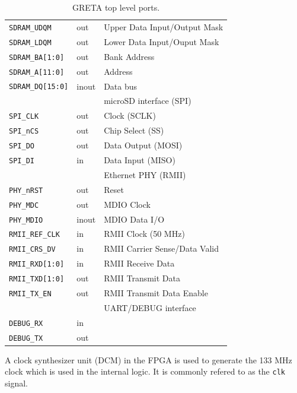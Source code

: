 \documentclass[a4paper]{report}
\begin{document}
\begin{table}
\begin{tabular}{*3l}
\texttt{SDRAM\_UDQM}        & out   & Upper Data Input/Output Mask \\
\texttt{SDRAM\_LDQM}        & out   & Lower Data Input/Ouput Mask \\
\texttt{SDRAM\_BA[1:0]}     & out   & Bank Address \\
\texttt{SDRAM\_A[11:0]}     & out   & Address \\
\texttt{SDRAM\_DQ[15:0]}    & inout & Data bus \\
\midrule
\midrule
                    &       & microSD interface (SPI) \\
\midrule
\texttt{SPI\_CLK}   & out   & Clock (SCLK) \\
\texttt{SPI\_nCS}   & out   & Chip Select (SS) \\
\texttt{SPI\_DO}    & out   & Data Output (MOSI) \\
\texttt{SPI\_DI}    & in    & Data Input (MISO)\\
\midrule
\midrule
                        &       & Ethernet PHY (RMII) \\
\midrule
\texttt{PHY\_nRST}      & out   & Reset \\
\texttt{PHY\_MDC}       & out   & MDIO Clock \\
\texttt{PHY\_MDIO}      & inout & MDIO Data I/O \\
\texttt{RMII\_REF\_CLK} & in    & RMII Clock (50 MHz) \\
\texttt{RMII\_CRS\_DV}  & in    & RMII Carrier Sense/Data Valid \\
\texttt{RMII\_RXD[1:0]} & in    & RMII Receive Data \\
\texttt{RMII\_TXD[1:0]} & out   & RMII Transmit Data \\
\texttt{RMII\_TX\_EN}   & out   & RMII Transmit Data Enable \\
\midrule
\midrule
                    &       & UART/DEBUG interface \\
\midrule
\texttt{DEBUG\_RX}  & in    & \\
\texttt{DEBUG\_TX}  & out   & \\
\midrule
\bottomrule
 \hline
\end{tabular}
\caption{GRETA top level ports.}
\label{top_level}
\end{table}

A clock synthesizer unit (DCM) in the FPGA is used to generate the
133 MHz clock which is used in the internal logic. It is commonly refered
to as the \texttt{clk} signal.
\end{document}
